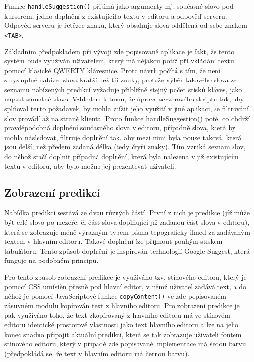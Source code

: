 \documentclass[a4paper,11pt]{article}
\begin{document}
Funkce {\tt handleSuggestion()} přijímá jako argumenty mj. současné slovo pod kursorem, jedno doplnění z existujícího textu v editoru a odpověď serveru. Odpověď serveru je řetězec znaků, který obsahuje slova oddělená od sebe znakem {\tt <TAB>}. 

Základním předpokladem při vývoji zde popisované aplikace je fakt, že tento systém bude využíván uživatelem, který má nějakou potíž při vkládání textu pomocí klasické QWERTY klávesnice. Proto návrh počítá s tím, že není smysluplné nabízet slova kratší než tři znaky, protože výběr takového slova ze seznamu nabízených predikcí vyžaduje přibližně stejný počet stisků kláves, jako napsat samotné slovo. Vzhledem k tomu, že úprava serverového skriptu tak, aby splňoval tento požadavek, by mohla ztížit jeho využití v jiné aplikaci, se filtrování slov provádí až na straně klienta. Proto funkce handleSuggestion() poté, co obdrží pravděpodobná doplnění současného slova v editoru, případně slova, která by mohla následovat, filtruje doplnění tak, aby mezi nimi byla pouze taková, která jsou delší, než předem zadaná délka (tedy čtyři znaky). Tím vzniká seznam slov, do něhož stačí doplnit případná doplnění, která byla nalezena v již existujícím textu v editoru, aby bylo možno jej prezentovat uživateli.

\subsection{Zobrazení predikcí}

Nabídka predikcí sestává ze dvou různých částí. První z nich je predikce (jíž může být celé slovo po mezeře, či část slova doplňující již zadanou část slova v editoru), která se zobrazuje méně výrazným typem písma topograficky ihned za zadávaným textem v hlavním editoru. Takové doplnění lze přijmout pouhým stiskem tabulátoru. Tento způsob doplnění je inspirován technologií Google Suggest, která funguje na podobném principu. 

Pro tento způsob zobrazení predikce je využíváno tzv. stínového editoru, který je pomocí CSS umístěn přesně pod hlavní editor, v němž uživatel zadává text, a do něhož je pomocí JavaScriptové funkce {\tt copyContent()} ve zde popisovaném zásuvném modulu kopírován text z hlavního editoru. Pro zobrazení predikce je pak využíváno toho, že text zkopírovaný z hlavního editoru má ve stínovém editoru identické prostorové vlastnosti jako text hlavního editoru a lze na jeho konec snadno připojit aktuální predikci, která se tak zobrazuje uživateli fontem stínového editoru, který v případě zde popisované implementace má šedou barvu (předpokládá se, že text v hlavním editoru má černou barvu). 
\end{document}

